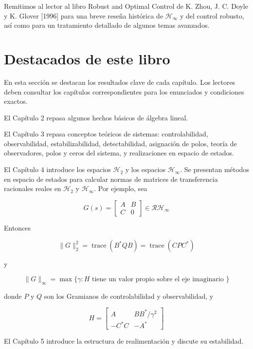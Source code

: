 Remitimos al lector al libro Robust and Optimal Control de K. Zhou, J. C. Doyle y K. Glover [1996] para una breve reseña histórica de $\mathcal{H}_{\infty}$ y del control robusto, así como para un tratamiento detallado de algunos temas avanzados.

\section{Destacados de este libro}
En esta sección se destacan los resultados clave de cada capítulo. Los lectores deben consultar los capítulos correspondientes para los enunciados y condiciones exactos.

El Capítulo 2 repasa algunos hechos básicos de álgebra lineal.

El Capítulo 3 repasa conceptos teóricos de sistemas: controlabilidad, observabilidad, estabilizabilidad, detectabilidad, asignación de polos, teoría de observadores, polos y ceros del sistema, y realizaciones en espacio de estados.

El Capítulo 4 introduce los espacios $\mathcal{H}_{2}$ y los espacios $\mathcal{H}_{\infty}$. Se presentan métodos en espacio de estados para calcular normas de matrices de transferencia racionales reales en $\mathcal{H}_{2}$ y $\mathcal{H}_{\infty}$. Por ejemplo, sea

$$
G(s)=\left[\begin{array}{c|c}
A & B \\
\hline C & 0
\end{array}\right] \in \mathcal{R} \mathcal{H}_{\infty}
$$

Entonces

$$
\|G\|_{2}^{2}=\operatorname{trace}\left(B^{*} Q B\right)=\operatorname{trace}\left(C P C^{*}\right)
$$

y

$$
\|G\|_{\infty}=\max \{\gamma: H \text { tiene un valor propio sobre el eje imaginario }\}
$$

donde $P$ y $Q$ son los Gramianos de controlabilidad y observabilidad, y

$$
H=\left[\begin{array}{cc}
A & B B^{*} / \gamma^{2} \\
-C^{*} C & -A^{*}
\end{array}\right]
$$

El Capítulo 5 introduce la estructura de realimentación y discute su estabilidad.


